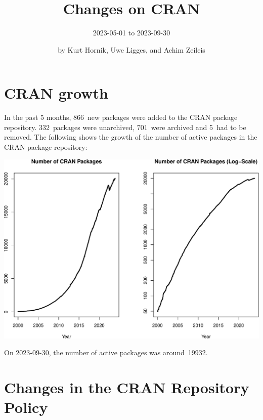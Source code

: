 \title{Changes on CRAN}

\subtitle{%
2023-05-01 to 2023-09-30
}

\author{by Kurt Hornik, Uwe Ligges, and Achim Zeileis}

\maketitle


\hypertarget{cran-growth}{%
\section{CRAN growth}\label{cran-growth}}

In the past 5 months, 866~new packages were
added to the CRAN package repository. 332~packages
were unarchived, 701~were archived and
5~had to be removed. The following shows the
growth of the number of active packages in the CRAN package repository:

\begin{center}\includegraphics[width=1\linewidth]{cran_files/figure-latex/cran_growth-1} \end{center}

\noindent On 2023-09-30, the number of active packages was around~19932.

\hypertarget{changes-in-the-cran-repository-policy}{%
\section{Changes in the CRAN Repository Policy}\label{changes-in-the-cran-repository-policy}}

